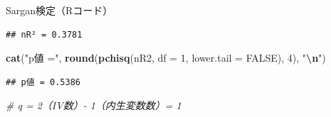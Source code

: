 \documentclass[
  ignorenonframetext,
]{beamer}
\newenvironment{Shaded}{\begin{snugshade}}{\end{snugshade}}
\newcommand{\AttributeTok}[1]{\textcolor[rgb]{0.13,0.29,0.53}{#1}}
\newcommand{\CommentTok}[1]{\textcolor[rgb]{0.56,0.35,0.01}{\textit{#1}}}
\newcommand{\ConstantTok}[1]{\textcolor[rgb]{0.56,0.35,0.01}{#1}}
\newcommand{\DecValTok}[1]{\textcolor[rgb]{0.00,0.00,0.81}{#1}}
\newcommand{\FunctionTok}[1]{\textcolor[rgb]{0.13,0.29,0.53}{\textbf{#1}}}
\newcommand{\NormalTok}[1]{#1}
\newcommand{\OtherTok}[1]{\textcolor[rgb]{0.56,0.35,0.01}{#1}}
\newcommand{\SpecialCharTok}[1]{\textcolor[rgb]{0.81,0.36,0.00}{\textbf{#1}}}
\newcommand{\StringTok}[1]{\textcolor[rgb]{0.31,0.60,0.02}{#1}}
\begin{document}
\begin{frame}[fragile]{Sargan検定（Rコード）}
\label{sarganux691cux5b9arux30b3ux30fcux30c9}
\scriptsize

\begin{Shaded}
\end{Shaded}

\begin{verbatim}
## nR² = 0.3781
\end{verbatim}

\begin{Shaded}
\begin{Highlighting}[]
\FunctionTok{cat}\NormalTok{(}\StringTok{"p値 ="}\NormalTok{, }\FunctionTok{round}\NormalTok{(}\FunctionTok{pchisq}\NormalTok{(nR2, }\AttributeTok{df =} \DecValTok{1}\NormalTok{, }\AttributeTok{lower.tail =} \ConstantTok{FALSE}\NormalTok{), }\DecValTok{4}\NormalTok{), }\StringTok{"}\SpecialCharTok{\textbackslash{}n}\StringTok{"}\NormalTok{)}
\end{Highlighting}
\end{Shaded}

\begin{verbatim}
## p値 = 0.5386
\end{verbatim}

\begin{Shaded}
\begin{Highlighting}[]
\CommentTok{\# q = 2（IV数）{-} 1（内生変数数）= 1}
\end{Highlighting}
\end{Shaded}

\normalsize
\end{frame}
\end{document}
